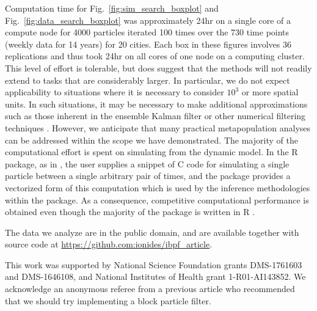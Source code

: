 \documentclass[12pt]{article}\usepackage[]{graphicx}\usepackage[]{xcolor}
\begin{document}
Computation time for Fig.~\ref{fig:sim_search_boxplot} and Fig.~\ref{fig:data_search_boxplot} was approximately 24hr on a single core of a compute node for 4000 particles iterated 100 times over the 730 time points (weekly data for 14 years) for 20 cities.
Each box in these figures involves 36 replications and thus took 24hr on all cores of one node on a computing cluster.
This level of effort is tolerable, but does suggest that the methods will not readily extend to tasks that are considerably larger. 
In particular, we do not expect applicability to situations where it is necessary to consider $10^3$ or more spatial units.
In such situations, it may be necessary to make additional approximations such as those inherent in the ensemble Kalman filter \citep{evensen09,katzfuss19} or other numerical filtering techniques \citep{whitehouse22}.
However, we anticipate that many practical metapopulation analyses can be addressed within the scope we have demonstrated.
The majority of the computational effort is spent on simulating from the dynamic model.
In the  R package, as in , the user supplies a snippet of C code for simulating a single particle between a single arbitrary pair of times, and the package provides a vectorized form of this computation which is used by the inference methodologies within the package.
As a consequence, competitive computational performance is obtained even though the majority of the package is written in R \citep[Table~1]{FitzJohn20}.

\vspace{3mm}



\vspace{1mm}

\noindent The data we analyze are in the public domain, and are available together with source code at \url{https://github.com:ionides/ibpf_article}.

\vspace{3mm}


\vspace{1mm}

\noindent This work was supported by National Science Foundation grants DMS-1761603 and DMS-1646108, and National Institutes of Health grant 1-R01-AI143852. We acknowledge an anonymous referee from a previous article who recommended that we should try implementing a block particle filter.
\end{document}
